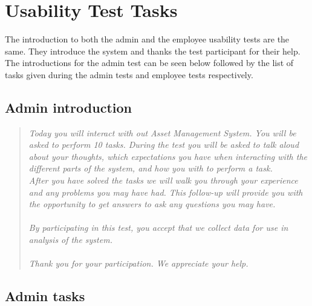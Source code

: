\chapter{Usability Test Tasks} \label{app:usabilityTest}

The introduction to both the admin and the employee usability tests are the same. They introduce the system and thanks the test participant for their help. The introductions for the admin test can be seen below followed by the list of tasks given during the admin tests and employee tests respectively. 

\section*{Admin introduction}

\begin{quote}
    \textit{Today you will interact with out Asset Management System. You will be asked to perform 10 tasks. During the test you will be asked to talk aloud about your thoughts, which expectations you have when interacting with the different parts of the system, and how you with to perform a task.
    \\
    After you have solved the tasks we will walk you through your experience and any problems you may have had. This follow-up will provide you with the opportunity to get answers to ask any questions you may have. 
    \\\\
    By participating in this test, you accept that we collect data for use in analysis of the system.
    \\\\
    Thank you for your participation. We appreciate your help.}
\end{quote}


\section*{Admin tasks}

